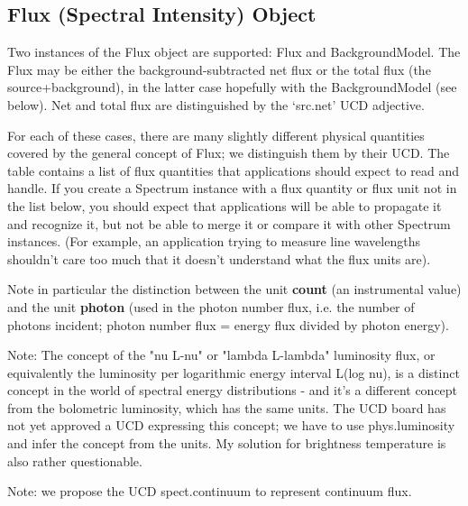 \documentclass[11pt]{article}
\begin{document}
\subsection{Flux (Spectral Intensity) Object}

 
Two instances of the Flux object are supported:
Flux and BackgroundModel.
The Flux may be either the background-subtracted net flux
or the total flux
(the source+background), in the latter case hopefully with the BackgroundModel (see below).
Net and total flux are distinguished by the `src.net' UCD adjective.
 
For each of these cases, there are many slightly different physical quantities
covered by the general concept of Flux; we distinguish them
by their UCD. The table contains a list of flux quantities that applications
should expect to read and handle. If you create a Spectrum instance with
a flux quantity or flux unit not in the list below, you should expect that applications will be
able to propagate it and recognize it, but not be able to merge it or compare it
with other Spectrum instances. (For example, an application trying to measure
line wavelengths shouldn't care too much that it doesn't understand what the
flux units are).
  
Note in particular the distinction between the unit {\bf count }  (an
instrumental value) and the unit {\bf photon }  (used in the photon number flux, i.e.
the number of photons incident; photon number flux = energy flux divided by photon
energy).



Note: The concept of the "nu L-nu" or "lambda L-lambda" luminosity flux, or equivalently the luminosity per logarithmic
energy interval L(log nu), is a distinct concept in the world of spectral energy
distributions - and it's a different concept from the bolometric luminosity, which has the same units.
The UCD board has not yet approved a UCD expressing
this concept; we have to use phys.luminosity and infer the concept from the units.
My solution for brightness temperature is also rather questionable.


Note: we propose the UCD spect.continuum to represent continuum flux.
\end{document}
